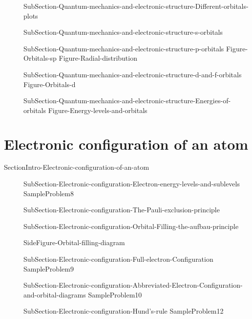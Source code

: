 \documentclass[main.tex]{subfiles}
\newcommand\chapterlabel{Ch-radiation}\setcounter{figurenewcounter}{0}\setcounter{tablenewcounter}{0}\setcounter{formulanewcounter}{0}
\begin{document}
\begin{description}
\item[] {SubSection-Quantum-mechanics-and-electronic-structure-Different-orbitals-plots}
\item[] {SubSection-Quantum-mechanics-and-electronic-structure-s-orbitals} 
\item[] {SubSection-Quantum-mechanics-and-electronic-structure-p-orbitals}
 {Figure-Orbitals-sp}
{Figure-Radial-distribution}

\item[] {SubSection-Quantum-mechanics-and-electronic-structure-d-and-f-orbitals}
{Figure-Orbitals-d}




 

\item[] {SubSection-Quantum-mechanics-and-electronic-structure-Energies-of-orbitals}
{Figure-Energy-levels-and-orbitals}

\end{description}

\section{Electronic configuration of an atom}{SectionIntro-Electronic-configuration-of-an-atom}
\sloppy
\begin{description}
\item[] {SubSection-Electronic-configuration-Electron-energy-levels-and-sublevels}
  {SampleProblem8}
\item[] {SubSection-Electronic-configuration-The-Pauli-exclusion-principle}
     \label{Fig:{\chapterlabel}\thefigurenewcounter} 

\item[]{SubSection-Electronic-configuration-Orbital-Filling-the-aufbau-principle}

{SideFigure-Orbital-filling-diagram}
 \item[] {SubSection-Electronic-configuration-Full-electron-Configuration}
  {SampleProblem9}

\item[] 
{SubSection-Electronic-configuration-Abbreviated-Electron-Configuration-and-orbital-diagrams}
  {SampleProblem10}
  \item[] {SubSection-Electronic-configuration-Hund's-rule}
{SampleProblem12}
\end{description}
\newpage
\end{document}
